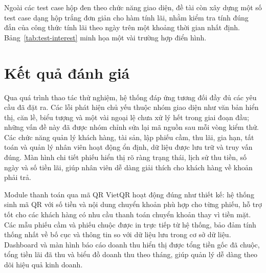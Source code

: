 \documentclass[13pt,a4paper]{extreport}
\begin{document}
Ngoài các test case hộp đen theo chức năng giao diện, đề tài còn xây dựng một số test case dạng hộp trắng đơn giản cho hàm tính lãi, nhằm kiểm tra tính đúng đắn của công thức tính lãi theo ngày trên một khoảng thời gian nhất định. Bảng~\ref{tab:test-interest} minh họa một vài trường hợp điển hình.

\begin{table}[H]
\centering
\caption{Bảng kiểm thử hàm tính lãi theo ngày}
\label{tab:test-interest}
%
\end{table}

\section{Kết quả đánh giá}

Qua quá trình thao tác thử nghiệm, hệ thống đáp ứng tương đối đầy đủ các yêu cầu đã đặt ra. Các lỗi phát hiện chủ yếu thuộc nhóm giao diện như văn bản hiển thị, căn lề, biểu tượng và một vài ngoại lệ chưa xử lý hết trong giai đoạn đầu; những vấn đề này đã được nhóm chỉnh sửa lại mã nguồn sau mỗi vòng kiểm thử. Các chức năng quản lý khách hàng, tài sản, lập phiếu cầm, thu lãi, gia hạn, tất toán và quản lý nhân viên hoạt động ổn định, dữ liệu được lưu trữ và truy vấn đúng. Màn hình chi tiết phiếu hiển thị rõ ràng trạng thái, lịch sử thu tiền, số ngày và số tiền lãi, giúp nhân viên dễ dàng giải thích cho khách hàng về khoản phải trả.

Module thanh toán qua mã QR VietQR hoạt động đúng như thiết kế: hệ thống sinh mã QR với số tiền và nội dung chuyển khoản phù hợp cho từng phiếu, hỗ trợ tốt cho các khách hàng có nhu cầu thanh toán chuyển khoản thay vì tiền mặt. Các mẫu phiếu cầm và phiếu chuộc được in trực tiếp từ hệ thống, bảo đảm tính thống nhất về bố cục và thông tin so với dữ liệu lưu trong cơ sở dữ liệu. Dashboard và màn hình báo cáo doanh thu hiển thị được tổng tiền gốc đã chuộc, tổng tiền lãi đã thu và biểu đồ doanh thu theo tháng, giúp quản lý dễ dàng theo dõi hiệu quả kinh doanh.
\end{document}

